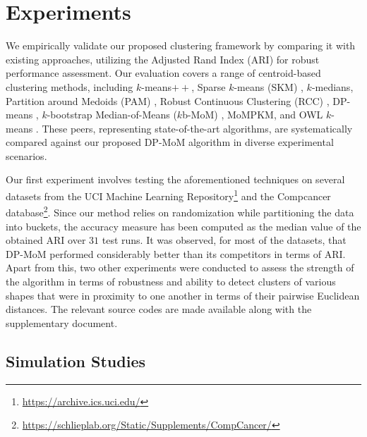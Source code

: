 \documentclass[12pt]{article}
\begin{document}
\section{Experiments}
\label{sec:experiments}
We empirically validate our proposed clustering framework by comparing it with existing approaches, utilizing the Adjusted Rand Index (ARI) for robust performance assessment. Our evaluation covers a range of centroid-based clustering methods, including $k$-means$++$, Sparse $k$-means (SKM) \cite{SKM-paper}, $k$-medians, Partition around Medoids (PAM) \cite{PAM-paper}, Robust Continuous Clustering (RCC) \cite{Shah2017-jj}, DP-means \cite{DP-Means}, $k$-bootstrap Median-of-Means ($k$b-MoM) \cite{brunetsaumard2020kbmom}, MoMPKM, and OWL $k$-means \cite{pmlr-v206-chakraborty23a}. These peers, representing state-of-the-art algorithms, are systematically compared against our proposed DP-MoM algorithm in diverse experimental scenarios.

Our first experiment involves testing the aforementioned techniques on several datasets from the UCI Machine Learning Repository\footnote{\url{https://archive.ics.uci.edu/}} and the Compcancer database\footnote{\url{https://schlieplab.org/Static/Supplements/CompCancer/}}. Since our method relies on randomization while partitioning the data into buckets, the accuracy measure has been computed as the median value of the obtained ARI over $31$ test runs. It was observed, for most of the datasets, that DP-MoM performed considerably better than its competitors in terms of ARI. Apart from this, two other experiments were conducted to assess the strength of the algorithm in terms of robustness and ability to detect clusters of various shapes that were in proximity to one another in terms of their pairwise Euclidean distances. The relevant source codes are made available along with the supplementary document. 


\subsection{Simulation Studies}
\end{document}
